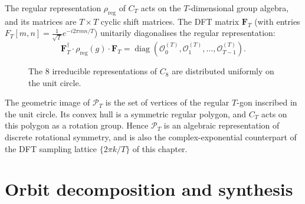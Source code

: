 \begin{definition}\label{def:regular_representation_dft}
The regular representation $\rho_{\text{reg}}$ of $C_T$ acts on the $T$-dimensional group algebra, and its matrices are $T \times T$ cyclic shift matrices. The DFT matrix $\mathbf{F}_T$ (with entries $F_T[m,n] = \frac{1}{\sqrt{T}} e^{-i2\pi mn/T}$) unitarily diagonalises the regular representation:
\[
\mathbf{F}_T^\dagger \cdot \rho_{\text{reg}}(g) \cdot \mathbf{F}_T = \operatorname{diag}(\mathcal{O}_0^{(T)}, \mathcal{O}_1^{(T)}, \dots, \mathcal{O}_{T-1}^{(T)}).
\]
\end{definition}

\begin{figure}[htbp]
    \centering
    \caption{The 8 irreducible representations of $C_8$ are distributed uniformly on the unit circle.}
    \label{fig:PPO_C8}
\end{figure}

\begin{remark}\label{rem:unit_root_geometry}
The geometric image of $\mathcal{P}_T$ is the set of vertices of the regular $T$-gon inscribed in the unit circle. Its convex hull is a symmetric regular polygon, and $C_T$ acts on this polygon as a rotation group. Hence $\mathcal{P}_T$ is an algebraic representation of discrete rotational symmetry, and is also the complex-exponential counterpart of the DFT sampling lattice $\{2\pi k/T\}$ of this chapter.
\end{remark}

\section{\texorpdfstring{Orbit decomposition and synthesis}{Orbit decomposition and synthesis}}\label{sec:orbit_decomposition_synthesis}

